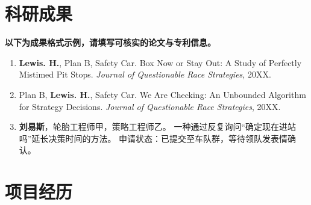 \section{科研成果}
\textbf{以下为成果格式示例，请填写可核实的论文与专利信息。}
\begin{enumerate}[leftmargin=1.5em]
    \item
    \begin{minipage}[t]{1\linewidth}
        \textbf{Lewis. H.}, Plan B, Safety Car.
        Box Now or Stay Out: A Study of Perfectly Mistimed Pit Stops.
        \textit{Journal of Questionable Race Strategies}, 20XX.
    \end{minipage}
    \item
    \begin{minipage}[t]{1\linewidth}
        Plan B, \textbf{Lewis. H.}, Safety Car.
        We Are Checking: An Unbounded Algorithm for Strategy Decisions.
        \textit{Journal of Questionable Race Strategies}, 20XX.
    \end{minipage}
    \item
    \begin{minipage}[t]{1\linewidth}
        \textbf{刘易斯}，轮胎工程师甲，策略工程师乙。
        一种通过反复询问“确定现在进站吗”延长决策时间的方法。
        申请状态：已提交至车队群，等待领队发表情确认。
    \end{minipage}
\end{enumerate}

\section{项目经历}
\begin{GeneralSkills}
\end{GeneralSkills}

\begin{GeneralSkills}
\end{GeneralSkills}

